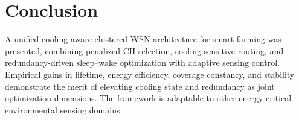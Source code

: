\section{Conclusion}
A unified cooling-aware clustered WSN architecture for smart farming was presented, combining penalized CH selection, cooling-sensitive routing, and redundancy-driven sleep--wake optimization with adaptive sensing control. Empirical gains in lifetime, energy efficiency, coverage constancy, and stability demonstrate the merit of elevating cooling state and redundancy as joint optimization dimensions. The framework is adaptable to other energy-critical environmental sensing domains.

